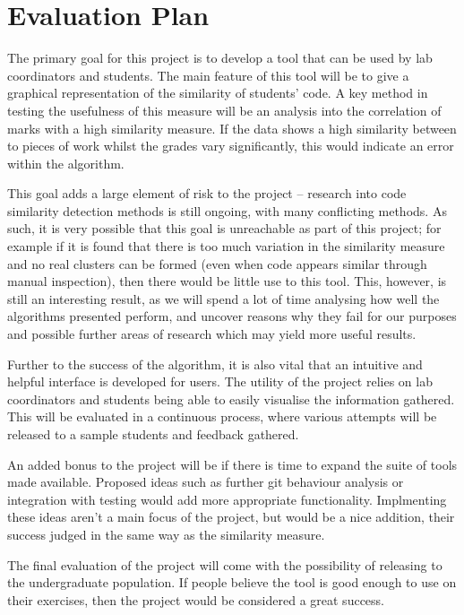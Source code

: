 
\chapter{Evaluation Plan} %

\label{EvaluationPlan} %


The primary goal for this project is to develop a tool that can be used by lab
coordinators and students. The main feature of this tool will be to give a
graphical representation of the similarity of students' code. A key method in
testing the usefulness of this measure will be an analysis into the correlation
of marks with a high similarity measure. If the data shows a high similarity
between to pieces of work whilst the grades vary significantly, this would indicate
an error within the algorithm. 

This goal adds a large element of risk to the project -- research into code
similarity detection methods is still ongoing, with many conflicting methods. As
such, it is very possible that this goal is unreachable as part of this project;
for example if it is found that there is too much variation in the similarity
measure and no real clusters can be formed (even when code appears similar through
manual inspection), then there would be little use to this tool. This, however, is
still an interesting result, as we will spend a lot of time analysing how well
the algorithms presented perform, and uncover reasons why they fail for our
purposes and possible further areas of research which may yield more useful results.

Further to the success of the algorithm, it is also vital that an intuitive and
helpful interface is developed for users. The utility of the project relies on
lab coordinators and students being able to easily visualise the information
gathered. This will be evaluated in a continuous process, where various attempts
will be released to a sample students and feedback gathered. 

An added bonus to the project will be if there is time to expand the suite of 
tools made available. Proposed ideas such as further git behaviour analysis
or integration with testing would add more appropriate functionality. Implmenting
these ideas aren't a main focus of the project, but would be a nice addition,
their success judged in the same way as the similarity measure.

The final evaluation of the
project will come with the possibility of releasing to the undergraduate population.
If people believe the tool is good enough to use on their exercises, then the project
would be considered a great success.